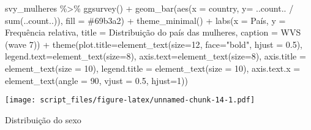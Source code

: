 \documentclass[
]{article}
\newenvironment{Shaded}{\begin{snugshade}}{\end{snugshade}}
\newcommand{\AttributeTok}[1]{\textcolor[rgb]{0.77,0.63,0.00}{#1}}
\newcommand{\DecValTok}[1]{\textcolor[rgb]{0.00,0.00,0.81}{#1}}
\newcommand{\FloatTok}[1]{\textcolor[rgb]{0.00,0.00,0.81}{#1}}
\newcommand{\FunctionTok}[1]{\textcolor[rgb]{0.00,0.00,0.00}{#1}}
\newcommand{\NormalTok}[1]{#1}
\newcommand{\SpecialCharTok}[1]{\textcolor[rgb]{0.00,0.00,0.00}{#1}}
\newcommand{\StringTok}[1]{\textcolor[rgb]{0.31,0.60,0.02}{#1}}
\begin{document}
\begin{Shaded}
\begin{Highlighting}[]
\NormalTok{svy\_mulheres }\SpecialCharTok{\%\textgreater{}\%}
  \FunctionTok{ggsurvey}\NormalTok{() }\SpecialCharTok{+}
  \FunctionTok{geom\_bar}\NormalTok{(}\FunctionTok{aes}\NormalTok{(}\AttributeTok{x =}\NormalTok{ country, }\AttributeTok{y=}\NormalTok{ ..count.. }\SpecialCharTok{/} \FunctionTok{sum}\NormalTok{(..count..)), }\AttributeTok{fill =} \StringTok{\textquotesingle{}\#69b3a2\textquotesingle{}}\NormalTok{) }\SpecialCharTok{+}
  \FunctionTok{theme\_minimal}\NormalTok{() }\SpecialCharTok{+}
  \FunctionTok{labs}\NormalTok{(}\AttributeTok{x =} \StringTok{\textquotesingle{}País\textquotesingle{}}\NormalTok{,}
       \AttributeTok{y =} \StringTok{\textquotesingle{}Frequência relativa\textquotesingle{}}\NormalTok{,}
       \AttributeTok{title =} \StringTok{\textquotesingle{}Distribuição do país das mulheres\textquotesingle{}}\NormalTok{,}
       \AttributeTok{caption =} \StringTok{\textquotesingle{}WVS (wave 7)\textquotesingle{}}\NormalTok{) }\SpecialCharTok{+}
  \FunctionTok{theme}\NormalTok{(}\AttributeTok{plot.title=}\FunctionTok{element\_text}\NormalTok{(}\AttributeTok{size=}\DecValTok{12}\NormalTok{, }\AttributeTok{face=}\StringTok{"bold"}\NormalTok{, }\AttributeTok{hjust =} \FloatTok{0.5}\NormalTok{),}
        \AttributeTok{legend.text=}\FunctionTok{element\_text}\NormalTok{(}\AttributeTok{size=}\DecValTok{8}\NormalTok{),}
        \AttributeTok{axis.text=}\FunctionTok{element\_text}\NormalTok{(}\AttributeTok{size=}\DecValTok{8}\NormalTok{),}
        \AttributeTok{axis.title =} \FunctionTok{element\_text}\NormalTok{(}\AttributeTok{size =} \DecValTok{10}\NormalTok{),}
        \AttributeTok{legend.title =} \FunctionTok{element\_text}\NormalTok{(}\AttributeTok{size =} \DecValTok{10}\NormalTok{),}
        \AttributeTok{axis.text.x =} \FunctionTok{element\_text}\NormalTok{(}\AttributeTok{angle =} \DecValTok{90}\NormalTok{, }\AttributeTok{vjust =} \FloatTok{0.5}\NormalTok{, }\AttributeTok{hjust=}\DecValTok{1}\NormalTok{))}
\end{Highlighting}
\end{Shaded}

\texttt{[image: script\_files/figure-latex/unnamed-chunk-14-1.pdf]}

Distribuição do sexo
\end{document}
